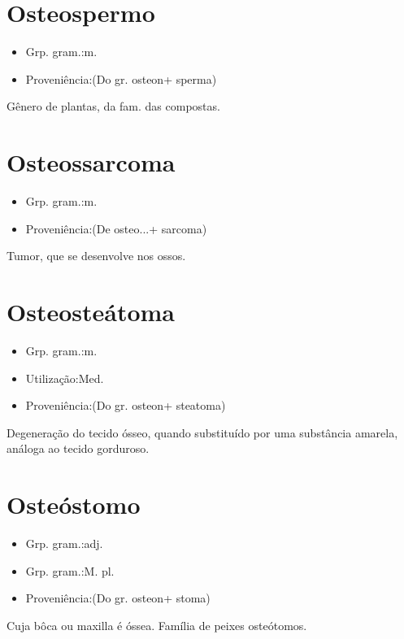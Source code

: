 \section{Osteospermo}
\begin{itemize}
\item {Grp. gram.:m.}
\end{itemize}
\begin{itemize}
\item {Proveniência:(Do gr. \textunderscore osteon\textunderscore  + \textunderscore sperma\textunderscore )}
\end{itemize}
Gênero de plantas, da fam. das compostas.
\section{Osteossarcoma}
\begin{itemize}
\item {Grp. gram.:m.}
\end{itemize}
\begin{itemize}
\item {Proveniência:(De \textunderscore osteo...\textunderscore  + \textunderscore sarcoma\textunderscore )}
\end{itemize}
Tumor, que se desenvolve nos ossos.
\section{Osteosteátoma}
\begin{itemize}
\item {Grp. gram.:m.}
\end{itemize}
\begin{itemize}
\item {Utilização:Med.}
\end{itemize}
\begin{itemize}
\item {Proveniência:(Do gr. \textunderscore osteon\textunderscore  + \textunderscore steatoma\textunderscore )}
\end{itemize}
Degeneração do tecido ósseo, quando substituído por uma substância amarela, análoga ao tecido gorduroso.
\section{Osteóstomo}
\begin{itemize}
\item {Grp. gram.:adj.}
\end{itemize}
\begin{itemize}
\item {Grp. gram.:M. pl.}
\end{itemize}
\begin{itemize}
\item {Proveniência:(Do gr. \textunderscore osteon\textunderscore  + \textunderscore stoma\textunderscore )}
\end{itemize}
Cuja bôca ou maxilla é óssea.
Família de peixes osteótomos.
